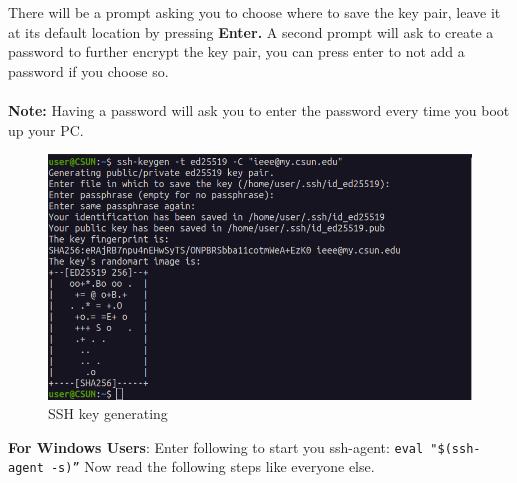 \documentclass[12pt, a4paper]{article}
\begin{document}
\noindent There will be a prompt asking you to choose where to save the key pair, leave it at its default location by pressing \textbf{Enter.} A second prompt will ask to create a password to further encrypt the key pair, you can press enter to not add a password if you choose so.\\\\
\textbf{Note:} Having a password will ask you to enter the password every time you boot up your PC. \\

\begin{figure}[H]
\centering
\includegraphics[scale=0.4]{../images/workshop-I/key-gen.png}
\caption{SSH key generating}
\end{figure}

\noindent\textbf{For Windows Users}: Enter following to start you ssh-agent: \texttt{eval "\$(ssh-agent -s)”} Now read the following steps like everyone else.\\
\end{document}

